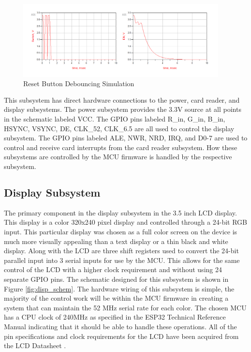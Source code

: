 \documentclass[12pt]{article}
\begin{document}
\begin{figure}[!h]
	\centering
	\includegraphics[width=0.95\textwidth]{reset_debounce.png}
	\caption{Reset Button Debouncing Simulation}
	\label{fig:debounce}
\end{figure}

This subsystem has direct hardware connections to the power, card reader, and display subsystems. The power subsystem provides the 3.3V source at all points in the schematic labeled VCC. The GPIO pins labeled R\_in, G\_in, B\_in, HSYNC, VSYNC, DE, CLK\_52, CLK\_6.5 are all used to control the display subsystem. The GPIO pins labeled ALE, NWR, NRD, IRQ, and D0-7 are used to control and receive card interrupts from the card reader subsystem. How these subsystems are controlled by the MCU firmware is handled by the respective subsystem.

\subsection{Display Subsystem}

The primary component in the display subsystem in the 3.5 inch LCD display. This display is a color 320x240 pixel display and controlled through a 24-bit RGB input. This particular display was chosen as a full color screen on the device is much more visually appealing than a text display or a thin black and white display. Along with the LCD are three shift registers used to convert the 24-bit parallel input into 3 serial inputs for use by the MCU. This allows for the same control of the LCD with a higher clock requirement and without using 24 separate GPIO pins. The schematic designed for this subsystem is shown in Figure \ref{fig:disp_schem}. The hardware wiring of this subsystem is simple, the majority of the control work will be within the MCU firmware in creating a system that can maintain the 52 MHz serial rate for each color. The chosen MCU has a CPU clock of 240MHz as specified in the ESP32 Technical Reference Manual \cite{esp32_tech} indicating that it should be able to handle these operations. All of the pin specifications and clock requirements for the LCD have been acquired from the LCD Datasheet \cite{orient_lcd}.
\end{document}
